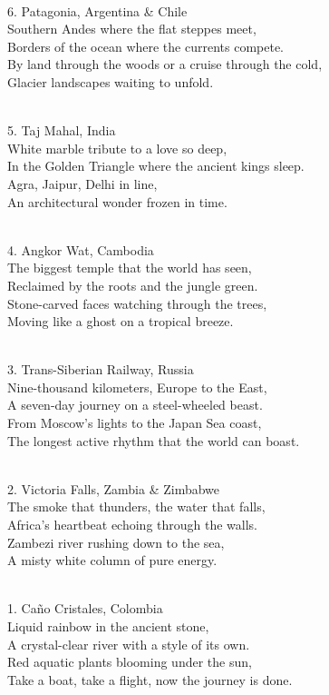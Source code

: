 \begin{lyrics}
\\
6. Patagonia, Argentina \& Chile
\\
Southern Andes where the flat steppes meet,\\
Borders of the ocean where the currents compete.\\
By land through the woods or a cruise through the cold,\\
Glacier landscapes waiting to unfold.

\\
5. Taj Mahal, India
\\
White marble tribute to a love so deep,\\
In the Golden Triangle where the ancient kings sleep.\\
Agra, Jaipur, Delhi in line,\\
An architectural wonder frozen in time.

\\
4. Angkor Wat, Cambodia
\\
The biggest temple that the world has seen,\\
Reclaimed by the roots and the jungle green.\\
Stone-carved faces watching through the trees,\\
Moving like a ghost on a tropical breeze.

\\
3. Trans-Siberian Railway, Russia
\\
Nine-thousand kilometers, Europe to the East,\\
A seven-day journey on a steel-wheeled beast.\\
From Moscow’s lights to the Japan Sea coast,\\
The longest active rhythm that the world can boast.

\\
2. Victoria Falls, Zambia \& Zimbabwe
\\
The smoke that thunders, the water that falls,\\
Africa’s heartbeat echoing through the walls.\\
Zambezi river rushing down to the sea,\\
A misty white column of pure energy.

\\
1. Caño Cristales, Colombia
\\
Liquid rainbow in the ancient stone,\\
A crystal-clear river with a style of its own.\\
Red aquatic plants blooming under the sun,\\
Take a boat, take a flight, now the journey is done.


\end{lyrics}
